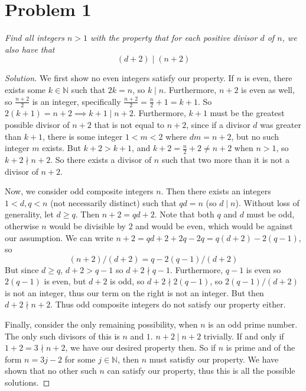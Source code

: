\documentclass{article}
\newcommand{\N}{{\mathbb N}}
\begin{document}
\section{Problem 1}
{\it Find all integers $n>1$ with the property that for each positive
divisor $d$ of $n$, we also have that
\[
	(d+2)\mid(n+2)
\]
}
\begin{proof}[Solution]
	We first show no even integers satisfy our property.
	If $n$ is even, there exists some $k \in \N$ such that $2k = n$,
	so $k \mid n$.
	Furthermore, $n+2$ is even as well,
	so $\frac{n+2}{2}$ is an integer,
	specifically $\frac{n+2}{2} = \frac{n}{2}+1 = k+1$.
	So $2(k+1) = n+2 \implies k+1 \mid n+2$.
	Furthermore, $k+1$ must be the greatest possible divisor of $n+2$
	that is not equal to $n+2$,
	since if a divisor $d$ was greater than $k+1$,
	there is some integer $1 < m < 2$ where $dm = n+2$,
	but no such integer $m$ exists.
	But $k + 2 > k + 1$, and $k + 2 = \frac{n}{2} + 2 \neq n + 2$
	when $n > 1$,
	so $k + 2 \nmid n + 2$.
	So there exists a divisor of $n$ such that two more than it
	is not a divisor of $n + 2$.

	Now, we consider odd composite integers $n$.
	Then there exists an integers $1 < d,q < n$ (not necessarily distinct)
	such that $qd = n$ (so $d \mid n$).
	Without loss of generality, let $d \geq q$.
	Then $n + 2 = qd + 2$.
	Note that both $q$ and $d$ must be odd,
	otherwise $n$ would be divisible by $2$ and would be even,
	which would be against our assumption.
	We can write $n + 2 = qd + 2 + 2q - 2q = q(d+2) - 2(q-1)$,
	so
	\[
		(n+2)/(d+2) = q - 2(q-1)/(d+2)
	\]
	But since $d \geq q$, $d+2 > q - 1$ so $d+2 \nmid q-1$.
	Furthermore, $q-1$ is even so $2(q-1)$ is even,
	but $d+2$ is odd, so $d+2 \nmid 2(q-1)$,
	so $2(q-1)/(d+2)$ is not an integer,
	thus our term on the right is not an integer.
	But then $d + 2 \nmid n+2$.
	Thus odd composite integers do not satisfy our property either.

	Finally, consider the only remaining possibility,
	when $n$ is an odd prime number.
	The only such divisors of this is $n$ and $1$.
	$n + 2 \mid n + 2$ trivially.
	If and only if $1 + 2 = 3 \nmid n + 2$, we have our desired property then.
	So if $n$ is prime and of the form $n = 3j - 2$ for some $j \in \N$,
	then $n$ must satisfiy our property.
	We have shown that no other such $n$ can satisfy our property,
	thus this is all the possible solutions.
\end{proof}
\clearpage
\end{document}
